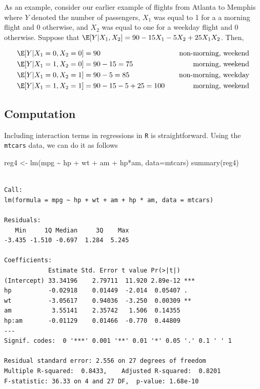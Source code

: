 \documentclass[
  letterpaper,
  DIV=11,
  numbers=noendperiod]{scrreprt}
\newenvironment{Shaded}{\begin{snugshade}}{\end{snugshade}}
\newcommand{\AttributeTok}[1]{\textcolor[rgb]{0.40,0.45,0.13}{#1}}
\newcommand{\FunctionTok}[1]{\textcolor[rgb]{0.28,0.35,0.67}{#1}}
\newcommand{\NormalTok}[1]{\textcolor[rgb]{0.00,0.23,0.31}{#1}}
\newcommand{\OtherTok}[1]{\textcolor[rgb]{0.00,0.23,0.31}{#1}}
\newcommand{\SpecialCharTok}[1]{\textcolor[rgb]{0.37,0.37,0.37}{#1}}
\begin{document}
\begin{itemize}
  As an example, consider our earlier example of flights from Atlanta to
  Memphis where \(Y\) denoted the number of passengers, \(X_1\) was
  equal to 1 for a a morning flight and 0 otherwise, and \(X_2\) was
  equal to one for a weekday flight and 0 otherwise. Suppose that
  \(\E[Y|X_1,X_2] = 90 - 15 X_1 - 5 X_2 + 25 X_1 X_2\). Then,

  \[
    \begin{aligned}
      \E[Y|X_1=0,X_2=0] &= 90 \quad & \textrm{non-morning, weekend} \\
      \E[Y|X_1=1,X_2=0] &= 90 - 15 = 75 \quad & \textrm{morning, weekend} \\
      \E[Y|X_1=0,X_2=1] &= 90 - 5 = 85 \quad  & \textrm{non-morning, weekday} \\
      \E[Y|X_1=1,X_2=1] &= 90 - 15 - 5 + 25 = 100 \quad & \textrm{morning, weekend}
    \end{aligned}
    \]
\end{itemize}

\subsection{Computation}\label{computation-4}

Including interaction terms in regressions in \texttt{R} is
straightforward. Using the \texttt{mtcars} data, we can do it as follows

\begin{Shaded}
\begin{Highlighting}[]
\NormalTok{reg4 }\OtherTok{\textless{}{-}} \FunctionTok{lm}\NormalTok{(mpg }\SpecialCharTok{\textasciitilde{}}\NormalTok{ hp }\SpecialCharTok{+}\NormalTok{ wt }\SpecialCharTok{+}\NormalTok{ am }\SpecialCharTok{+}\NormalTok{ hp}\SpecialCharTok{*}\NormalTok{am, }\AttributeTok{data=}\NormalTok{mtcars)}
\FunctionTok{summary}\NormalTok{(reg4)}
\end{Highlighting}
\end{Shaded}

\begin{verbatim}

Call:
lm(formula = mpg ~ hp + wt + am + hp * am, data = mtcars)

Residuals:
   Min     1Q Median     3Q    Max 
-3.435 -1.510 -0.697  1.284  5.245 

Coefficients:
            Estimate Std. Error t value Pr(>|t|)    
(Intercept) 33.34196    2.79711  11.920 2.89e-12 ***
hp          -0.02918    0.01449  -2.014  0.05407 .  
wt          -3.05617    0.94036  -3.250  0.00309 ** 
am           3.55141    2.35742   1.506  0.14355    
hp:am       -0.01129    0.01466  -0.770  0.44809    
---
Signif. codes:  0 '***' 0.001 '**' 0.01 '*' 0.05 '.' 0.1 ' ' 1

Residual standard error: 2.556 on 27 degrees of freedom
Multiple R-squared:  0.8433,    Adjusted R-squared:  0.8201 
F-statistic: 36.33 on 4 and 27 DF,  p-value: 1.68e-10
\end{verbatim}
\end{document}
